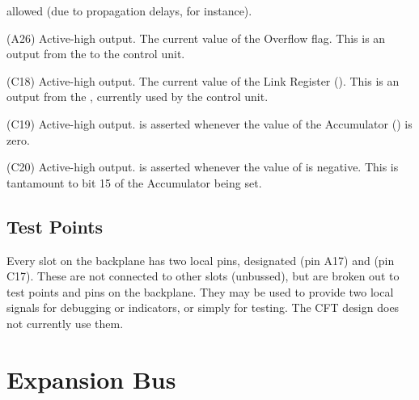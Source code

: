 \begin{description}
  allowed (due to propagation delays, for instance).
\item{\bfseries \FV} (A26) Active-high output. The current value of the
  Overflow flag. This is an output from the \ALU{} to the control unit.
\item{\bfseries \FL} (C18) Active-high output. The current value of the Link
  Register (\Lreg). This is an output from the \ALU{}, currently used by
  the control unit.
\item{\bfseries \FZERO} (C19) Active-high output. \FZERO{} is asserted
  whenever the value of the \gls{Accumulator} (\A) is zero.
\item{\bfseries \FNEG} (C20) Active-high output. \FNEG{} is asserted
  whenever the value of \A{} is negative. This is tantamount to bit
  15 of the \gls{Accumulator} being set.
\end{description}



\subsection{Test Points}

Every slot on the backplane has two local pins, designated \TPA{} (pin
A17) and \TPC{} (pin C17). These are not connected to other slots
(unbussed), but are broken out to test points and pins on the
backplane. They may be used to provide two local signals for debugging
or indicators, or simply for testing. The CFT design does not
currently use them.

\section{Expansion Bus}
\label{sec-expansion}

